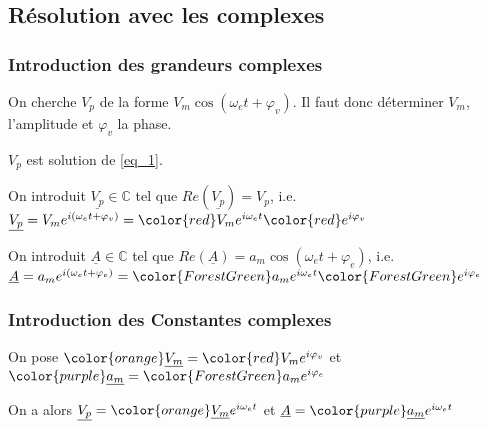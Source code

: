 \documentclass[french]{yLectureNote}
\begin{document}
\subsection{Résolution avec les complexes}
\subsubsection{Introduction des grandeurs complexes}
On cherche $V_p$ de la forme $V_m\cos(\omega_e t +\varphi_v)$. Il faut donc déterminer $V_m$, l'amplitude et $\varphi_v$ la phase.

$V_p$ est solution de \eqref{eq_1}.

On introduit $\underline{V_p} \in\mathbb{C}$ tel que $Re(\underline{V_p}) = V_p$, i.e. $\underline{V_p} = V_m e^{i(\omega_e t+\varphi_v)} = {\color{red}V_m} e^{i\omega_e t} {\color{red}e^{i\varphi_v}}$

On introduit $\underline{A} \in\mathbb{C}$ tel que $Re(\underline{A}) = a_m\cos(\omega_e t+\varphi_e)$, i.e. $\underline{A} = a_m e^{i(\omega_e t+\varphi_e)} = {\color{ForestGreen}a_m} e^{i\omega_e t}{\color{ForestGreen}e^{i\varphi_e}}$
\subsubsection{Introduction des Constantes complexes}
On pose ${\color{orange}\underline{V_m}} = {\color{red}V_m e^{i\varphi_v}}$ et ${\color{purple}\underline{a_m} }= {\color{ForestGreen}a_m e^{i\varphi_e}}$

On a alors $\underline{V_p} = {\color{orange}\underline{V_m}} e^{i\omega_e t}$ et $\underline{A} = {\color{purple}\underline{a_m} } e^{i\omega_e t}$
\end{document}
